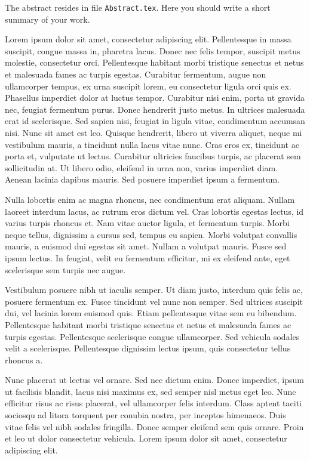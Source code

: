 The abstract resides in file \texttt{Abstract.tex}. Here you should
write a short summary of your work.

Lorem ipsum dolor sit amet, consectetur adipiscing elit. Pellentesque
in massa suscipit, congue massa in, pharetra lacus. Donec nec felis
tempor, suscipit metus molestie, consectetur orci. Pellentesque
habitant morbi tristique senectus et netus et malesuada fames ac
turpis egestas. Curabitur fermentum, augue non ullamcorper tempus, ex
urna suscipit lorem, eu consectetur ligula orci quis ex. Phasellus
imperdiet dolor at luctus tempor. Curabitur nisi enim, porta ut
gravida nec, feugiat fermentum purus. Donec hendrerit justo metus. In
ultrices malesuada erat id scelerisque. Sed sapien nisi, feugiat in
ligula vitae, condimentum accumsan nisi. Nunc sit amet est
leo. Quisque hendrerit, libero ut viverra aliquet, neque mi vestibulum
mauris, a tincidunt nulla lacus vitae nunc. Cras eros ex, tincidunt ac
porta et, vulputate ut lectus. Curabitur ultricies faucibus turpis, ac
placerat sem sollicitudin at. Ut libero odio, eleifend in urna non,
varius imperdiet diam. Aenean lacinia dapibus mauris. Sed posuere
imperdiet ipsum a fermentum.

Nulla lobortis enim ac magna rhoncus, nec condimentum erat
aliquam. Nullam laoreet interdum lacus, ac rutrum eros dictum
vel. Cras lobortis egestas lectus, id varius turpis rhoncus et. Nam
vitae auctor ligula, et fermentum turpis. Morbi neque tellus,
dignissim a cursus sed, tempus eu sapien. Morbi volutpat convallis
mauris, a euismod dui egestas sit amet. Nullam a volutpat
mauris. Fusce sed ipsum lectus. In feugiat, velit eu fermentum
efficitur, mi ex eleifend ante, eget scelerisque sem turpis nec augue.

Vestibulum posuere nibh ut iaculis semper. Ut diam justo, interdum
quis felis ac, posuere fermentum ex. Fusce tincidunt vel nunc non
semper. Sed ultrices suscipit dui, vel lacinia lorem euismod
quis. Etiam pellentesque vitae sem eu bibendum. Pellentesque habitant
morbi tristique senectus et netus et malesuada fames ac turpis
egestas. Pellentesque scelerisque congue ullamcorper. Sed vehicula
sodales velit a scelerisque. Pellentesque dignissim lectus ipsum, quis
consectetur tellus rhoncus a.

Nunc placerat ut lectus vel ornare. Sed nec dictum enim. Donec
imperdiet, ipsum ut facilisis blandit, lacus nisi maximus ex, sed
semper nisl metus eget leo. Nunc efficitur risus ac risus placerat,
vel ullamcorper felis interdum. Class aptent taciti sociosqu ad litora
torquent per conubia nostra, per inceptos himenaeos. Duis vitae felis
vel nibh sodales fringilla. Donec semper eleifend sem quis
ornare. Proin et leo ut dolor consectetur vehicula. Lorem ipsum dolor
sit amet, consectetur adipiscing elit.

